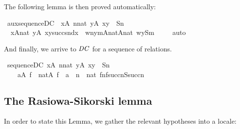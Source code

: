 %
The following lemma is then proved automatically:

\begin{isabelle}
\isamarkupfalse%
\ aux{\isacharunderscore}sequence{\isacharunderscore}DC\ {\isacharcolon}\ {\isachardoublequoteopen}{\isasymforall}x{\isasymin}A{\isachardot}\ {\isasymforall}n{\isasymin}nat{\isachardot}\ {\isasymexists}y{\isasymin}A{\isachardot}\ {\isasymlangle}x{\isacharcomma}y{\isasymrangle}\ {\isasymin}\ S{\isacharbackquote}n\ {\isasymLongrightarrow}\isanewline
 \ \ {\isasymforall}x{\isasymin}A{\isasymtimes}nat{\isachardot}\ {\isasymexists}y{\isasymin}A{\isachardot}\ {\isasymlangle}x{\isacharcomma}{\isasymlangle}y{\isacharcomma}succ{\isacharparenleft}snd{\isacharparenleft}x{\isacharparenright}{\isacharparenright}{\isasymrangle}{\isasymrangle}\ {\isasymin}\ {\isacharbraceleft}{\isasymlangle}{\isasymlangle}w{\isacharcomma}n{\isasymrangle}{\isacharcomma}{\isasymlangle}y{\isacharcomma}m{\isasymrangle}{\isasymrangle}{\isasymin}{\isacharparenleft}A{\isasymtimes}nat{\isacharparenright}{\isasymtimes}{\isacharparenleft}A{\isasymtimes}nat{\isacharparenright}{\isachardot}\ {\isasymlangle}w{\isacharcomma}y{\isasymrangle}{\isasymin}S{\isacharbackquote}m\ {\isacharbraceright}{\isachardoublequoteclose}\isanewline
\ \ %
\isamarkupfalse%
\ auto%
\end{isabelle}
%
And finally, we arrive to $\mathit{DC}$ for a sequence of relations.

\begin{isabelle}
\isamarkupfalse%
\ sequence{\isacharunderscore}DC{\isacharcolon}\ {\isachardoublequoteopen}{\isasymforall}x{\isasymin}A{\isachardot}\ {\isasymforall}n{\isasymin}nat{\isachardot}\ {\isasymexists}y{\isasymin}A{\isachardot}\ {\isasymlangle}x{\isacharcomma}y{\isasymrangle}\ {\isasymin}\ S{\isacharbackquote}n\ {\isasymLongrightarrow}\isanewline
\ \ \ \ {\isasymforall}a{\isasymin}A{\isachardot}\ {\isacharparenleft}{\isasymexists}f\ {\isasymin}\ nat{\isasymrightarrow}A{\isachardot}\ f{\isacharbackquote}{}\ {\isacharequal}\ a\ {\isasymand}\ {\isacharparenleft}{\isasymforall}n\ {\isasymin}\ nat{\isachardot}\ {\isasymlangle}f{\isacharbackquote}n{\isacharcomma}f{\isacharbackquote}succ{\isacharparenleft}n{\isacharparenright}{\isasymrangle}{\isasymin}S{\isacharbackquote}succ{\isacharparenleft}n{\isacharparenright}{\isacharparenright}{\isacharparenright}{\isachardoublequoteclose}
\end{isabelle}

\subsection{The Rasiowa-Sikorski lemma}\label{sec:rasiowa-sikorski-lemma}
In order to state this Lemma, we gather the relevant hypotheses into a locale:

